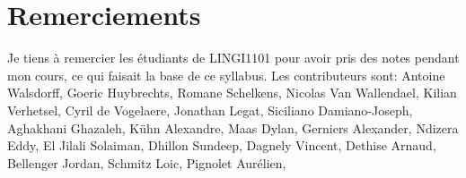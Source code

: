 \section*{Remerciements}

Je tiens à remercier les étudiants de LINGI1101 pour avoir pris des
notes pendant mon cours, ce qui faisait la base de ce syllabus.  Les
contributeurs sont:
Antoine Walsdorff,
Goeric Huybrechts,
Romane Schelkens,
Nicolas Van Wallendael, %
Kilian Verhetsel,
Cyril de Vogelaere,
Jonathan Legat, %
Siciliano Damiano-Joseph,
Aghakhani Ghazaleh,
Kühn Alexandre,
Maas Dylan, %
Gerniers Alexander,
Ndizera Eddy,
El Jilali Solaiman,
Dhillon Sundeep, %
Dagnely Vincent,
Dethise Arnaud,
Bellenger Jordan,
Schmitz Loic, %
Pignolet Aurélien,

